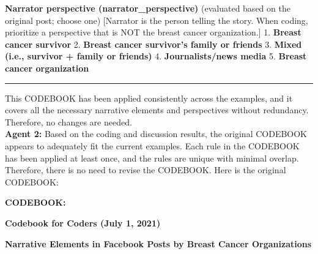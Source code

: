 \textbf{Narrator perspective (narrator\_perspective)} (evaluated based
on the original post; choose one) {[}Narrator is the person telling the
story. When coding, prioritize a perspective that is NOT the breast
cancer organization.{]} 1. \textbf{Breast cancer survivor} 2.
\textbf{Breast cancer survivor's family or friends} 3. \textbf{Mixed
(i.e., survivor + family or friends)} 4. \textbf{Journalists/news media}
5. \textbf{Breast cancer organization}

\begin{center}\rule{0.5\linewidth}{0.5pt}\end{center}

This CODEBOOK has been applied consistently across the examples, and it
covers all the necessary narrative elements and perspectives without
redundancy. Therefore, no changes are needed.\\

\textbf{Agent 2:} Based on the coding and discussion results, the original
CODEBOOK appears to adequately fit the current examples. Each rule in
the CODEBOOK has been applied at least once, and the rules are unique
with minimal overlap. Therefore, there is no need to revise the
CODEBOOK. Here is the original CODEBOOK:

\textbf{CODEBOOK:}

\textbf{Codebook for Coders (July 1, 2021)}

\textbf{Narrative Elements in Facebook Posts by Breast Cancer
Organizations}

